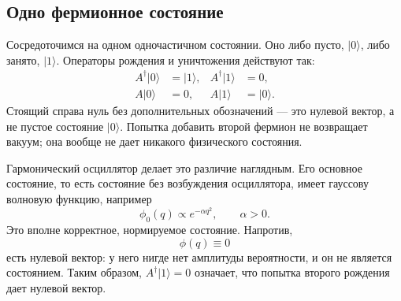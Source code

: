 \subsection{Одно фермионное состояние}

Сосредоточимся на одном одночастичном состоянии. Оно либо пусто, \(|0\rangle\), либо занято, \(|1\rangle\). Операторы рождения и уничтожения действуют так:
\begin{align}
A^\dagger|0\rangle&=|1\rangle,
&
A^\dagger|1\rangle&=0,
\\
A|0\rangle&=0,
&
A|1\rangle&=|0\rangle.
\end{align}
Стоящий справа нуль без дополнительных обозначений — это нулевой вектор, а не пустое состояние \(|0\rangle\). Попытка добавить второй фермион не возвращает вакуум; она вообще не дает никакого физического состояния.

\begin{classroomqa}
\end{classroomqa}

\begin{classroomqa}
\end{classroomqa}

Гармонический осциллятор делает это различие наглядным. Его основное состояние, то есть состояние без возбуждения осциллятора, имеет гауссову волновую функцию, например
\begin{equation}
\phi_0(q)\propto e^{-\alpha q^2},
\qquad \alpha>0.
\end{equation}
Это вполне корректное, нормируемое состояние. Напротив,
\begin{equation}
\phi(q)\equiv0
\end{equation}
есть нулевой вектор: у него нигде нет амплитуды вероятности, и он не является состоянием. Таким образом, \(A^\dagger|1\rangle=0\) означает, что попытка второго рождения дает нулевой вектор.

\begin{classroomqa}
\end{classroomqa}


